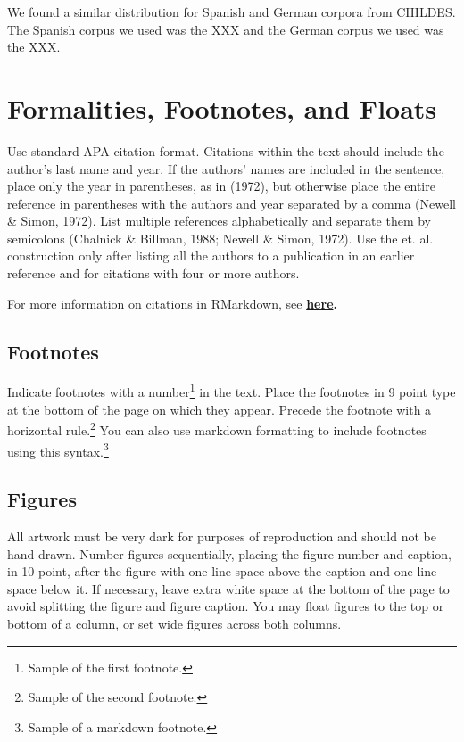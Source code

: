 \documentclass[10pt, letterpaper]{article}
\begin{document}
We found a similar distribution for Spanish and German corpora from
CHILDES. The Spanish corpus we used was the XXX and the German corpus we
used was the XXX.

\section{Formalities, Footnotes, and
Floats}\label{formalities-footnotes-and-floats}

Use standard APA citation format. Citations within the text should
include the author's last name and year. If the authors' names are
included in the sentence, place only the year in parentheses, as in
(1972), but otherwise place the entire reference in parentheses with the
authors and year separated by a comma (Newell \& Simon, 1972). List
multiple references alphabetically and separate them by semicolons
(Chalnick \& Billman, 1988; Newell \& Simon, 1972). Use the et. al.
construction only after listing all the authors to a publication in an
earlier reference and for citations with four or more authors.

For more information on citations in RMarkdown, see
\textbf{\href{http://rmarkdown.rstudio.com/authoring_bibliographies_and_citations.html\#citations}{here}.}

\subsection{Footnotes}\label{footnotes}

Indicate footnotes with a number\footnote{Sample of the first
footnote.} in the text. Place the footnotes in 9 point type at the
bottom of the page on which they appear. Precede the footnote with a
horizontal rule.\footnote{Sample of the second footnote.} You can also
use markdown formatting to include footnotes using this
syntax.\footnote{Sample of a markdown footnote.}

\subsection{Figures}\label{figures}

All artwork must be very dark for purposes of reproduction and should
not be hand drawn. Number figures sequentially, placing the figure
number and caption, in 10 point, after the figure with one line space
above the caption and one line space below it. If necessary, leave extra
white space at the bottom of the page to avoid splitting the figure and
figure caption. You may float figures to the top or bottom of a column,
or set wide figures across both columns.
\end{document}
